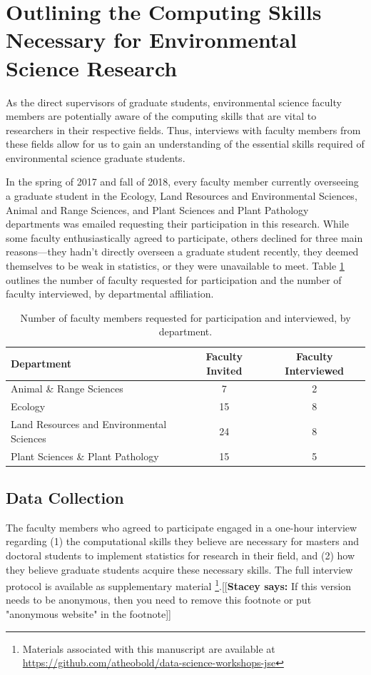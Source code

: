 \documentclass[12pt]{article}
\newcommand{\stacey}[1]{{\color{purple}[[\textbf{Stacey says: }#1]]}}
\begin{document}
\section{Outlining the Computing Skills Necessary for Environmental Science
Research}
\label{sec:faculty}

\quad As the direct supervisors of graduate students, environmental science
faculty members are potentially aware of the computing skills that are vital to
researchers in their respective fields. Thus, interviews with faculty members
from these fields allow for us to gain an understanding of the essential skills
required of environmental science graduate students. 

\quad In the spring of 2017 and fall of 2018, every faculty member
currently overseeing a graduate student in the
Ecology, Land Resources and Environmental Sciences, Animal and Range Sciences, 
and Plant Sciences and Plant Pathology departments was emailed
requesting their participation in this research. 
While some faculty enthusiastically agreed to participate, others declined for
three main reasons---they hadn't directly overseen a graduate student recently,
they deemed themselves to be weak in statistics, or they were unavailable to
meet. Table \ref{tab:faculty} outlines the number of faculty requested for
participation and the number of faculty interviewed, by departmental
affiliation. 

{
\begin{table}[h!]
\centering
\begin{tabular}{lcc}
\hline
Department & Faculty Invited & Faculty Interviewed  \\
\hline
Animal \& Range Sciences & 7 & 2 \\
Ecology & 15 & 8 \\
Land Resources and Environmental Sciences & 24 & 8 \\
Plant Sciences \& Plant Pathology &  15 & 5 \\ 
\hline
\end{tabular}
\caption{Number of faculty members requested for participation and interviewed,
by department.}
\label{tab:faculty}
\end{table}
}

\subsection{Data Collection}  

\quad The faculty members who agreed to participate engaged in a one-hour 
interview regarding (1) the computational skills they believe are necessary for
masters and doctoral students to implement statistics for research in their
field, and (2) how they believe graduate students acquire these necessary
skills. The full interview protocol is available as supplementary material 
\footnote{Materials associated with this manuscript are available at 
\href{https://github.com/atheobold/data-science-workshops-jse}{https://github.com/atheobold/data-science-workshops-jse}}.\stacey{If this version needs to be anonymous,
then you need to remove this footnote or put "anonymous website" in the footnote}
\end{document}
